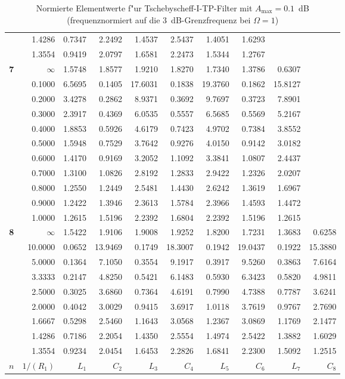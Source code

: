 \begin{table}[!htb]
\begin{center}
{\begin{tabular}{|c||r|r|r|r|r|r|r|r|r|}
&1.4286&0.7347&2.2492&1.4537&2.5437&1.4051&1.6293&     &     \\
&1.3554&0.9419&2.0797&1.6581&2.2473&1.5344&1.2767&     &     \\ \hline
\textbf{ 7}&$\infty$&1.5748&1.8577&1.9210&1.8270&1.7340&1.3786&0.6307&     \\
&0.1000&6.5695&0.1405&17.6031&0.1838&19.3760&0.1862&15.8127&     \\
&0.2000&3.4278&0.2862&8.9371&0.3692&9.7697&0.3723&7.8901&     \\
&0.3000&2.3917&0.4369&6.0535&0.5557&6.5685&0.5569&5.2167&     \\
&0.4000&1.8853&0.5926&4.6179&0.7423&4.9702&0.7384&3.8552&     \\
&0.5000&1.5948&0.7529&3.7642&0.9276&4.0150&0.9142&3.0182&     \\
&0.6000&1.4170&0.9169&3.2052&1.1092&3.3841&1.0807&2.4437&     \\
&0.7000&1.3100&1.0826&2.8192&1.2833&2.9422&1.2326&2.0207&     \\
&0.8000&1.2550&1.2449&2.5481&1.4430&2.6242&1.3619&1.6967&     \\
&0.9000&1.2422&1.3946&2.3613&1.5784&2.3966&1.4593&1.4472&     \\
&1.0000&1.2615&1.5196&2.2392&1.6804&2.2392&1.5196&1.2615&     \\ \hline
\textbf{ 8}&$\infty$&1.5422&1.9106&1.9008&1.9252&1.8200&1.7231&1.3683&0.6258\\
&10.0000&0.0652&13.9469&0.1749&18.3007&0.1942&19.0437&0.1922&15.3880\\
&5.0000&0.1364&7.1050&0.3554&9.1917&0.3917&9.5260&0.3863&7.6164\\
&3.3333&0.2147&4.8250&0.5421&6.1483&0.5930&6.3423&0.5820&4.9811\\
&2.5000&0.3025&3.6860&0.7364&4.6191&0.7990&4.7388&0.7787&3.6241\\
&2.0000&0.4042&3.0029&0.9415&3.6917&1.0118&3.7619&0.9767&2.7690\\
&1.6667&0.5298&2.5460&1.1643&3.0568&1.2367&3.0869&1.1769&2.1477\\
&1.4286&0.7186&2.2054&1.4350&2.5554&1.4974&2.5422&1.3882&1.6029\\
&1.3554&0.9234&2.0454&1.6453&2.2826&1.6841&2.2300&1.5092&1.2515\\  \hline\hline
$n$ & $1/(R_1)$ & $L_1$ & $C_2$ & $L_3$ & $C_4$ & $L_5$ & $C_6$ & $L_7$ & $C_8$\\ \hline
\end{tabular}\vspace*{-1mm}\caption{Normierte Elementwerte
    f"ur Tschebyscheff-I-TP-Filter mit $A_{\max}=0.1$~dB (frequenznormiert
    auf die 3~dB-Grenzfrequenz bei $\Omega=1$) \label{el-C1}}}
\end{center}
\vspace*{-6mm}
\end{table}%



